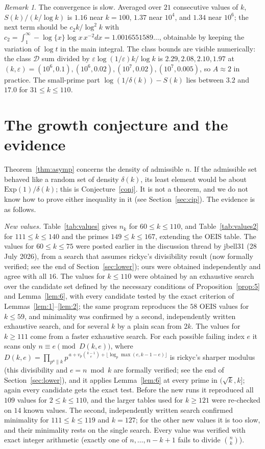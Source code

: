 \documentclass[11pt]{amsart}
\theoremstyle{remark}
\newtheorem{remark}[theorem]{Remark}
\newcommand{\Exp}{\mathrm{Exp}}
\begin{document}
\begin{remark}
The convergence is slow. Averaged over $21$ consecutive values of $k$, $S(k)/(k/\log k)$ is $1.16$ near $k=100$, $1.37$ near $10^4$, and $1.34$ near $10^6$; the next term should be $c_2k/\log^2k$ with $c_2=\int_1^\infty-\log\{x\}\log x\,x^{-2}dx=1.0016551589\ldots$, obtainable by keeping the variation of $\log t$ in the main integral. The class bounds are visible numerically: the class $\mathcal D$ sum divided by $\varepsilon\log(1/\varepsilon)k/\log k$ is $2.29,2.08,2.10,1.97$ at $(k,\varepsilon)=(10^6,0.1),(10^6,0.02),(10^7,0.02),(10^7,0.005)$, so $A\approx2$ in practice. The small-prime part $\log(1/\delta(k))-S(k)$ lies between $3.2$ and $17.0$ for $31\le k\le110$.
\end{remark}

\section{The growth conjecture and the evidence}\label{sec:evidence}

Theorem~\ref{thm:asymp} concerns the density of admissible $n$. If the admissible set behaved like a random set of density $\delta(k)$, its least element would be about $\Exp(1)/\delta(k)$; this is Conjecture~\ref{conj}. It is not a theorem, and we do not know how to prove either inequality in it (see Section~\ref{sec:cip}). The evidence is as follows.

\emph{New values.} Table~\ref{tab:values} gives $n_k$ for $60\le k\le110$, and Table~\ref{tab:values2} for $111\le k\le140$ and the primes $149\le k\le167$, extending the OEIS table. The values for $60\le k\le75$ were posted earlier in the discussion thread by jbell31 (28 July 2026), from a search that assumes rickyc's divisibility result (now formally verified; see the end of Section~\ref{sec:lower}); ours were obtained independently and agree with all $16$. The values for $k\le110$ were obtained by an exhaustive search over the candidate set defined by the necessary conditions of Proposition~\ref{prop:5} and Lemma~\ref{lem:6}, with every candidate tested by the exact criterion of Lemmas~\ref{lem:1}--\ref{lem:2}; the same program reproduces the $58$ OEIS values for $k\le59$, and minimality was confirmed by a second, independently written exhaustive search, and for several $k$ by a plain scan from $2k$. The values for $k\ge111$ come from a faster exhaustive search. For each possible failing index $e$ it scans only $n\equiv e\pmod{D(k,e)}$, where $D(k,e)=\prod_{p^a\|k}p^{\,a+v_p\binom{k-1}{e}+\lfloor\log_p\max(e,k-1-e)\rfloor}$ is rickyc's sharper modulus (this divisibility and $e=n\bmod k$ are formally verified; see the end of Section~\ref{sec:lower}), and it applies Lemma~\ref{lem:6} at every prime in $(\sqrt k,k]$; again every candidate gets the exact test. Before the new runs it reproduced all $109$ values for $2\le k\le110$, and the larger tables used for $k\ge121$ were re-checked on $14$ known values. The second, independently written search confirmed minimality for $111\le k\le119$ and $k=127$; for the other new values it is too slow, and their minimality rests on the single search. Every value was verified with exact integer arithmetic (exactly one of $n,\dots,n-k+1$ fails to divide $\binom nk$).
\end{document}
